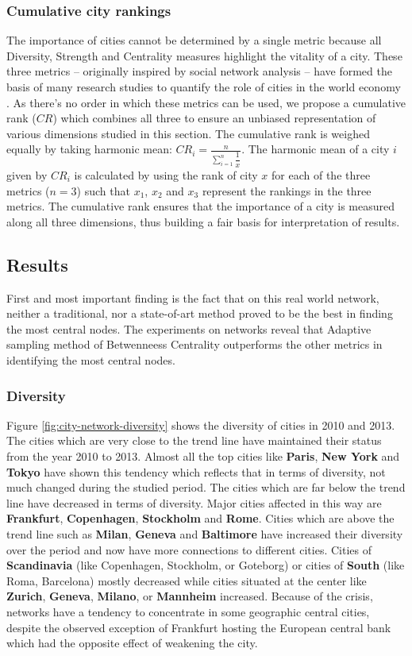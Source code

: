 			\subsubsection{Cumulative city rankings}
			The importance of cities cannot be determined by a single metric because all Diversity, Strength and Centrality measures highlight the vitality of a city. These three metrics -- originally inspired by social network analysis -- have formed the basis of many research studies to quantify the role of cities in the world economy \cite{alderson2004,derudder2010,rozenblat2017}. As there's no order in which these metrics can be used, we propose a cumulative rank ($CR$) which combines all three to ensure an unbiased representation of various dimensions studied in this section. The cumulative rank is weighed equally by taking harmonic mean: $CR_i=\frac{n}{\sum_{i=1}^{n} \dfrac{1}{x}}$. The harmonic mean of a city $i$ given by $CR_i$ is calculated by using the rank of city $x$ for each of the three metrics ($n=3$) such that $x_1$, $x_2$ and $x_3$ represent the rankings in the three metrics. The cumulative rank ensures that the importance of a city is measured along all three dimensions, thus building a fair basis for interpretation of results.
	
		\subsection{Results}
		First and most important finding is the fact that on this real world network, neither a traditional, nor a state-of-art method proved to be the best in finding the most central nodes. The experiments on networks reveal that Adaptive sampling method of Betwenneess Centrality outperforms the other metrics in identifying the most central nodes.
	
			\subsubsection{Diversity}
			Figure \ref{fig:city-network-diversity} shows the diversity of cities in 2010 and 2013. The cities which are very close to the trend line have maintained their status from the year 2010 to 2013. Almost all the top cities like \textbf{Paris}, \textbf{New York} and \textbf{Tokyo} have shown this tendency which reflects that in terms of diversity, not much changed during the studied period. The cities which are far below the trend line have decreased in terms of diversity. Major cities affected in this way are \textbf{Frankfurt}, \textbf{Copenhagen}, \textbf{Stockholm} and \textbf{Rome}. Cities which are above the trend line such as \textbf{Milan}, \textbf{Geneva} and \textbf{Baltimore} have increased their diversity over the period and now have more connections to different cities. Cities of \textbf{Scandinavia} (like Copenhagen, Stockholm, or Goteborg) or cities of \textbf{South} (like Roma, Barcelona) mostly decreased while cities situated at the center like \textbf{Zurich}, \textbf{Geneva}, \textbf{Milano}, or \textbf{Mannheim} increased. Because of the crisis, networks have a tendency to concentrate in some geographic central cities, despite the observed exception of Frankfurt hosting the European central bank which had the opposite effect of weakening the city.
			
